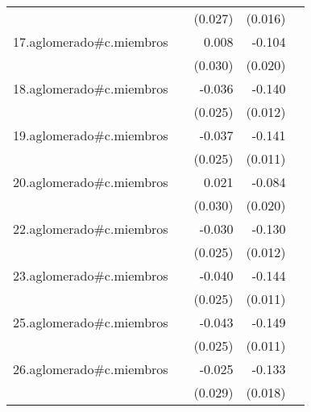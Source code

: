 {\begin{longtable}{l*{4}{D{.}{.}{-1}}}
            &                     &     (0.027)         &     (0.016)         &                     \\
\addlinespace
17.aglomerado#c.miembros&                     &       0.008         &      -0.104\sym{***}&                     \\
            &                     &     (0.030)         &     (0.020)         &                     \\
\addlinespace
18.aglomerado#c.miembros&                     &      -0.036         &      -0.140\sym{***}&                     \\
            &                     &     (0.025)         &     (0.012)         &                     \\
\addlinespace
19.aglomerado#c.miembros&                     &      -0.037         &      -0.141\sym{***}&                     \\
            &                     &     (0.025)         &     (0.011)         &                     \\
\addlinespace
20.aglomerado#c.miembros&                     &       0.021         &      -0.084\sym{***}&                     \\
            &                     &     (0.030)         &     (0.020)         &                     \\
\addlinespace
22.aglomerado#c.miembros&                     &      -0.030         &      -0.130\sym{***}&                     \\
            &                     &     (0.025)         &     (0.012)         &                     \\
\addlinespace
23.aglomerado#c.miembros&                     &      -0.040         &      -0.144\sym{***}&                     \\
            &                     &     (0.025)         &     (0.011)         &                     \\
\addlinespace
25.aglomerado#c.miembros&                     &      -0.043         &      -0.149\sym{***}&                     \\
            &                     &     (0.025)         &     (0.011)         &                     \\
\addlinespace
26.aglomerado#c.miembros&                     &      -0.025         &      -0.133\sym{***}&                     \\
            &                     &     (0.029)         &     (0.018)         &                     \\

\end{longtable}}
